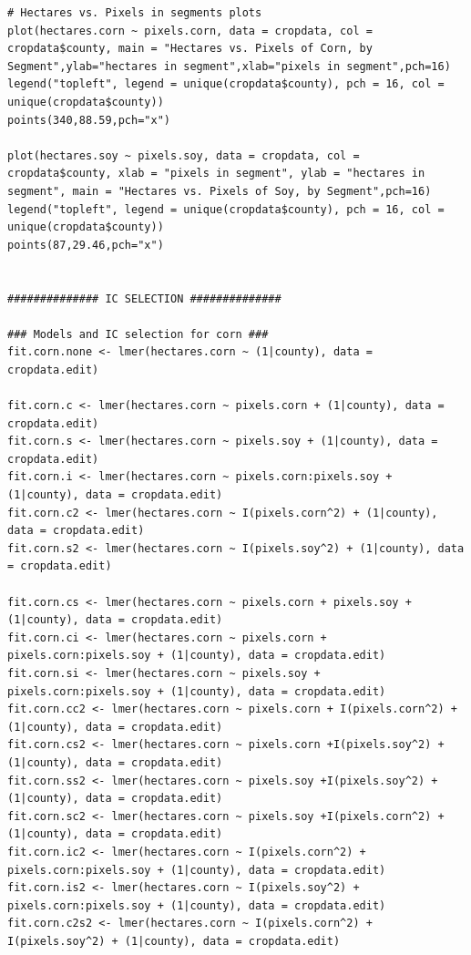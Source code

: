 \documentclass{article}
\begin{document}
\begin{Verbatim}[fontsize=\tiny]
# Hectares vs. Pixels in segments plots
plot(hectares.corn ~ pixels.corn, data = cropdata, col = cropdata$county, main = "Hectares vs. Pixels of Corn, by Segment",ylab="hectares in segment",xlab="pixels in segment",pch=16)
legend("topleft", legend = unique(cropdata$county), pch = 16, col = unique(cropdata$county))
points(340,88.59,pch="x")

plot(hectares.soy ~ pixels.soy, data = cropdata, col = cropdata$county, xlab = "pixels in segment", ylab = "hectares in segment", main = "Hectares vs. Pixels of Soy, by Segment",pch=16)
legend("topleft", legend = unique(cropdata$county), pch = 16, col = unique(cropdata$county))
points(87,29.46,pch="x")


############## IC SELECTION ##############

### Models and IC selection for corn ###
fit.corn.none <- lmer(hectares.corn ~ (1|county), data = cropdata.edit)

fit.corn.c <- lmer(hectares.corn ~ pixels.corn + (1|county), data = cropdata.edit)
fit.corn.s <- lmer(hectares.corn ~ pixels.soy + (1|county), data = cropdata.edit)
fit.corn.i <- lmer(hectares.corn ~ pixels.corn:pixels.soy + (1|county), data = cropdata.edit)
fit.corn.c2 <- lmer(hectares.corn ~ I(pixels.corn^2) + (1|county), data = cropdata.edit)
fit.corn.s2 <- lmer(hectares.corn ~ I(pixels.soy^2) + (1|county), data = cropdata.edit)

fit.corn.cs <- lmer(hectares.corn ~ pixels.corn + pixels.soy + (1|county), data = cropdata.edit)
fit.corn.ci <- lmer(hectares.corn ~ pixels.corn + pixels.corn:pixels.soy + (1|county), data = cropdata.edit)
fit.corn.si <- lmer(hectares.corn ~ pixels.soy + pixels.corn:pixels.soy + (1|county), data = cropdata.edit)
fit.corn.cc2 <- lmer(hectares.corn ~ pixels.corn + I(pixels.corn^2) + (1|county), data = cropdata.edit)
fit.corn.cs2 <- lmer(hectares.corn ~ pixels.corn +I(pixels.soy^2) + (1|county), data = cropdata.edit)
fit.corn.ss2 <- lmer(hectares.corn ~ pixels.soy +I(pixels.soy^2) + (1|county), data = cropdata.edit)
fit.corn.sc2 <- lmer(hectares.corn ~ pixels.soy +I(pixels.corn^2) + (1|county), data = cropdata.edit)
fit.corn.ic2 <- lmer(hectares.corn ~ I(pixels.corn^2) + pixels.corn:pixels.soy + (1|county), data = cropdata.edit)
fit.corn.is2 <- lmer(hectares.corn ~ I(pixels.soy^2) + pixels.corn:pixels.soy + (1|county), data = cropdata.edit)
fit.corn.c2s2 <- lmer(hectares.corn ~ I(pixels.corn^2) + I(pixels.soy^2) + (1|county), data = cropdata.edit)


\end{Verbatim}
\end{document}
